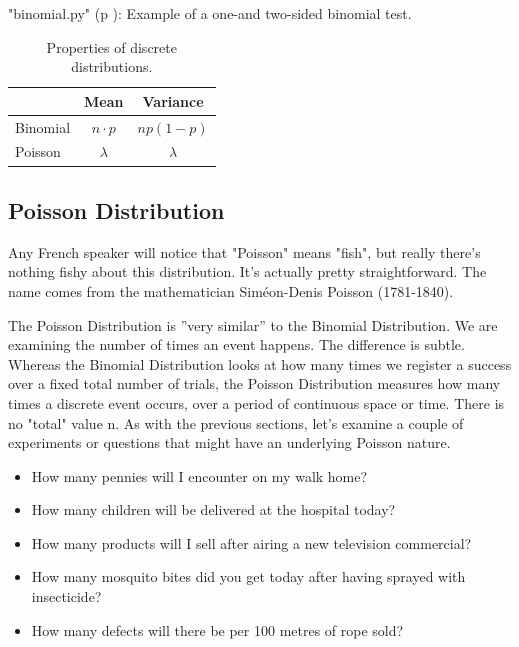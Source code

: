 \PyImg "binomial.py" (p \pageref{py:binomial}): Example of a one-and two-sided binomial test.

\begin{table}[ht]
  \centering
  \begin{tabular}{l|c|c|}
      & Mean & Variance \\
      \hline
      Binomial & $n \cdot p$ & $np(1-p)$ \\
      Poisson & $\lambda$ & $\lambda$ \\
  \end{tabular}
\caption{Properties of discrete distributions.}
\end{table}

\subsection{Poisson Distribution}

Any French speaker will notice that "Poisson" means "fish", but really there's nothing fishy about this distribution. It's actually pretty straightforward. The name comes from the mathematician Siméon-Denis Poisson (1781-1840).

The Poisson Distribution is ''very similar'' to the Binomial Distribution. We are examining the number of times an event happens. The difference is subtle. Whereas the Binomial Distribution looks at how many times we register a success over a fixed total number of trials, the Poisson Distribution measures how many times a discrete event occurs, over a period of continuous space or time. There is no "total" value n. As with the previous sections, let's examine a couple of experiments or questions that might have an underlying Poisson nature.

\begin{itemize}
  \item How many pennies will I encounter on my walk home?
  \item How many children will be delivered at the hospital today?
  \item How many products will I sell after airing a new television commercial?
  \item How many mosquito bites did you get today after having sprayed with insecticide?
  \item How many defects will there be per 100 metres of rope sold?
\end{itemize}

